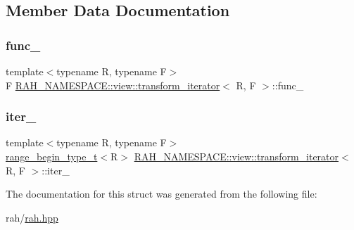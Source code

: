 \subsection{Member Data Documentation}
\mbox{\label{struct_r_a_h___n_a_m_e_s_p_a_c_e_1_1view_1_1transform__iterator_a710e156dfc00b745237dd3b725fb6c43}} 
\subsubsection{\texorpdfstring{func\_}{func\_}}
{\footnotesize\ttfamily template$<$typename R, typename F$>$ \\
F \mbox{\hyperlink{struct_r_a_h___n_a_m_e_s_p_a_c_e_1_1view_1_1transform__iterator}{R\+A\+H\+\_\+\+N\+A\+M\+E\+S\+P\+A\+C\+E\+::view\+::transform\+\_\+iterator}}$<$ R, F $>$\+::func\+\_\+}

\mbox{\label{struct_r_a_h___n_a_m_e_s_p_a_c_e_1_1view_1_1transform__iterator_a93cb5f63a7eb446bd2275ea21a00519d}} 
\subsubsection{\texorpdfstring{iter\_}{iter\_}}
{\footnotesize\ttfamily template$<$typename R, typename F$>$ \\
\mbox{\hyperlink{namespace_r_a_h___n_a_m_e_s_p_a_c_e_a46705781d6869d5151141f871ced1e9c}{range\+\_\+begin\+\_\+type\+\_\+t}}$<$R$>$ \mbox{\hyperlink{struct_r_a_h___n_a_m_e_s_p_a_c_e_1_1view_1_1transform__iterator}{R\+A\+H\+\_\+\+N\+A\+M\+E\+S\+P\+A\+C\+E\+::view\+::transform\+\_\+iterator}}$<$ R, F $>$\+::iter\+\_\+}



The documentation for this struct was generated from the following file\+:\begin{DoxyCompactItemize}
\item 
rah/\mbox{\hyperlink{rah_8hpp}{rah.\+hpp}}\end{DoxyCompactItemize}
